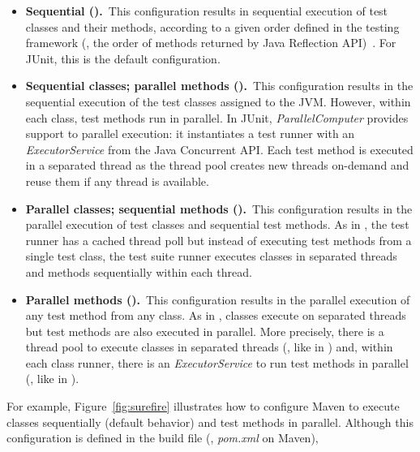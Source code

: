 \begin{itemize}
\item
    \textbf{Sequential (\Seq).}~This configuration results in
        sequential execution of test classes and their methods,
        according to a given order defined in the testing framework
        (\eg, the order of methods returned by Java Reflection
        API)~\cite{junit-test-order}. For JUnit, this is the default
        configuration.
\item
    \textbf{Sequential classes; parallel methods
        (\ParClassSeqMeth{}).}~This configuration results in the
        sequential execution of the test classes assigned to the JVM.
        However, within each class, test methods run in parallel. In
        JUnit, \emph{ParallelComputer} provides support to parallel
        execution: it instantiates a test runner with an
        \emph{ExecutorService} from the Java Concurrent API. Each test
        method is executed in a separated thread as the thread pool
        creates new threads on-demand and reuse them if any thread is
        available.
\item
    \textbf{Parallel classes; sequential methods
        (\SeqClassParMeth{}).}~This configuration results in the
        parallel execution of test classes and sequential test
        methods. As in \ParClassSeqMeth, the test runner has a cached
        thread poll but instead of executing test methods from a
        single test class, the test suite runner executes classes in
        separated threads and methods sequentially within each thread.
\item
    \textbf{Parallel methods (\ParClassParMeth).}~This configuration
        results in the parallel execution of any test method from any
        class.   As in \SeqClassParMeth, classes execute on separated
        threads but test methods are also executed in parallel. More
        precisely, there is a thread pool to execute classes in
        separated threads (\ie, like in \ParClassSeqMeth) and, within
        each class runner, there is an \emph{ExecutorService} to run
        test methods in parallel (\ie, like in \SeqClassParMeth).
\end{itemize}

 For example, Figure~\ref{fig:surefire} illustrates how to
configure Maven to execute classes sequentially (default behavior) and
test methods in parallel. Although this configuration is defined in
the build file (\eg, \emph{pom.xml} on Maven), 

